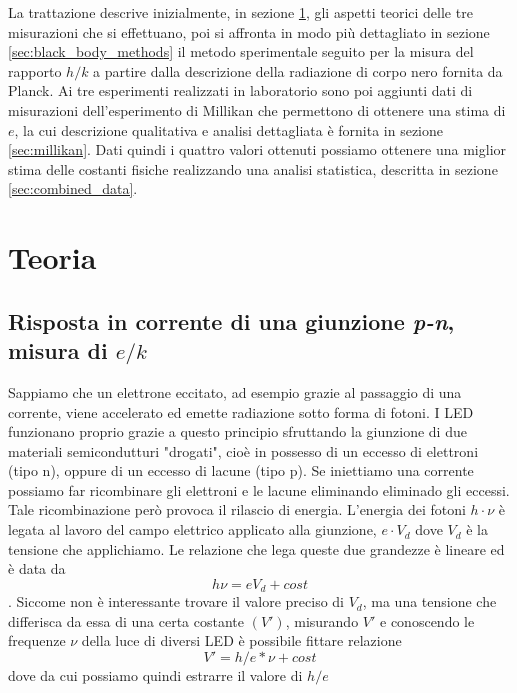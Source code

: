 \documentclass[a4paper, varvw, nofootinbib]{revtex4-2}
\begin{document}
La trattazione descrive inizialmente, in sezione \ref{sec:theory}, gli aspetti teorici delle tre misurazioni che si effettuano, poi si affronta in modo più dettagliato in sezione \ref{sec:black_body_methods} il metodo sperimentale seguito per la misura del rapporto $h/k$ a partire dalla descrizione della radiazione di corpo nero fornita da Planck. Ai tre esperimenti realizzati in laboratorio sono poi aggiunti dati di misurazioni dell'esperimento di Millikan che permettono di ottenere una stima di $e$, la cui descrizione qualitativa e analisi dettagliata è fornita in sezione \ref{sec:millikan}. Dati quindi i quattro valori ottenuti possiamo ottenere una miglior stima delle costanti fisiche realizzando una analisi statistica, descritta in sezione \ref{sec:combined_data}. 

\section{Teoria}\label{sec:theory}



\subsection{Risposta in corrente di una giunzione \emph{p-n}, misura di $e/k$}

Sappiamo che un elettrone eccitato, ad esempio grazie al passaggio di una corrente, viene accelerato ed emette radiazione sotto forma di fotoni. I LED funzionano proprio grazie a questo principio sfruttando la giunzione di due materiali semicondutturi "drogati", cioè in possesso di un eccesso di elettroni (tipo n), oppure di un eccesso di lacune (tipo p). Se iniettiamo una corrente possiamo far ricombinare gli elettroni e le lacune eliminando eliminado gli eccessi. Tale ricombinazione però provoca il rilascio di energia. L'energia dei fotoni $h\cdot\nu$ è legata al lavoro del campo elettrico applicato alla giunzione, $e\cdot V_{d}$ dove $V_{d}$ è la tensione che applichiamo. Le relazione che lega queste due grandezze è lineare ed è data da \begin{equation} h\nu=eV_d + cost \end{equation}. Siccome non è interessante trovare il valore preciso di $V_d$, ma una tensione che differisca da essa di una certa costante $(V')$, misurando $V'$ e conoscendo le frequenze $\nu$ della luce di diversi LED è possibile fittare relazione \begin{equation} V'=h/e*\nu + cost \end{equation} dove da cui possiamo quindi estrarre il valore di $h/e$ 
\end{document}
